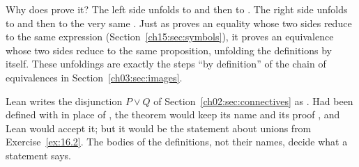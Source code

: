 Why does  prove it? The left side  unfolds to  and then to . The right side  unfolds to  and then to the very same . Just as  proves an equality whose two sides reduce to the same expression (Section~\ref{ch15:sec:symbols}), it proves an equivalence whose two sides reduce to the same proposition, unfolding the definitions by itself. These unfoldings are exactly the steps ``by definition'' of the chain of equivalences in Section~\ref{ch03:sec:images}.


Lean writes the disjunction $P\lor Q$ of Section~\ref{ch02:sec:connectives} as . Had  been defined with  in place of , the theorem  would keep its name and its proof , and Lean would accept it; but it would be the statement about unions from Exercise~\ref{ex:16.2}. The bodies of the definitions, not their names, decide what a statement says.
